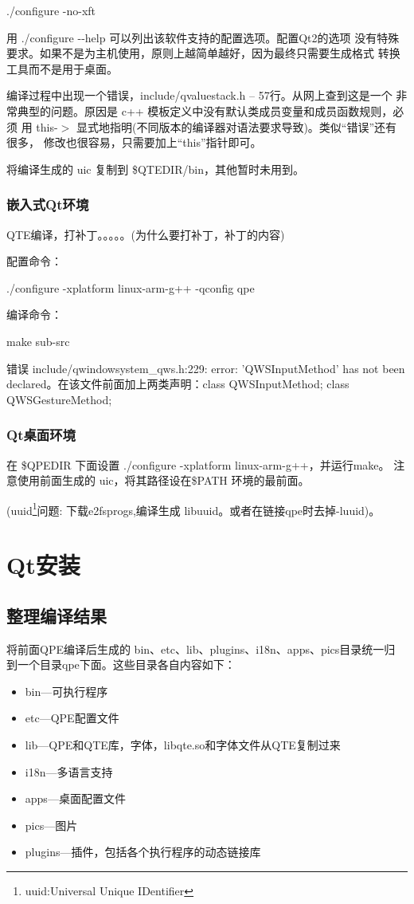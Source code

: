 \documentclass[nofonts]{ctexart}
\begin{document}
	./configure -no-xft

	用 ./configure -{}-help 可以列出该软件支持的配置选项。配置Qt2的选项
没有特殊要求。如果不是为主机使用，原则上越简单越好，因为最终只需要生成格式
转换工具而不是用于桌面。

	编译过程中出现一个错误，include/qvaluestack.h -- 57行。从网上查到这是一个
非常典型的问题。原因是 c++ 模板定义中没有默认类成员变量和成员函数规则，必须
用 this-$>$ 显式地指明(不同版本的编译器对语法要求导致)。类似``错误''还有很多，
修改也很容易，只需要加上``this''指针即可。

	将编译生成的 uic 复制到 \$QTEDIR/bin，其他暂时未用到。
\subsubsection{嵌入式Qt环境}
	QTE编译，打补丁。。。。。(为什么要打补丁，补丁的内容)

	配置命令：

	./configure -xplatform linux-arm-g++ -qconfig qpe

	编译命令：

	make sub-src

	错误 include/qwindowsystem\_qws.h:229: error: 'QWSInputMethod' has not been declared。在该文件前面加上两类声明：class QWSInputMethod;
 class QWSGestureMethod;

\vskip 10cm
\subsubsection{Qt桌面环境}
	在 \$QPEDIR 下面设置 ./configure -xplatform linux-arm-g++，并运行make。
注意使用前面生成的 uic，将其路径设在\$PATH 环境的最前面。

	(uuid\footnote{uuid:Universal Unique IDentifier}问题:
	下载e2fsprogs,编译生成 libuuid。或者在链接qpe时去掉-luuid)。
\vskip 6cm
\section{Qt安装}
\subsection{整理编译结果}
	将前面QPE编译后生成的 bin、etc、lib、plugins、i18n、apps、pics目录统一归
到一个目录qpe下面。这些目录各自内容如下：
\begin{itemize}\itemsep=-4pt
  \item bin---可执行程序
  \item etc---QPE配置文件
  \item lib---QPE和QTE库，字体，libqte.so和字体文件从QTE复制过来
  \item i18n---多语言支持
  \item apps---桌面配置文件
  \item pics---图片
  \item plugins---插件，包括各个执行程序的动态链接库
\end{itemize}
\end{document}
